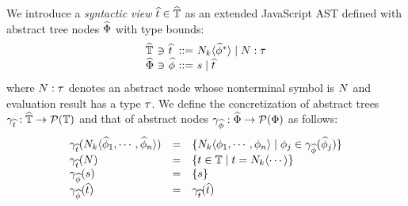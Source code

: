 We introduce a \textit{syntactic view} $\widehat{t} \in \widehat{\mathbb{T}}$ as an extended
JavaScript AST defined with abstract tree nodes $\widehat{\Phi}$ with type bounds:
\[
  \begin{array}{l@{~}c@{~}l@{~}c@{~}l}
    \atreeset &\ni& \atree &::=& \nt_k \langle \anode^* \rangle \mid \nt: \ty \\
    \anodeset &\ni& \anode &::=& \str \mid \atree\\
  \end{array}
\]
where $N: \tau$ denotes an abstract node whose nonterminal symbol is $N$ and
evaluation result has a type $\tau$.  We define the concretization of abstract
trees $\gamma_{\widehat{t}}: \widehat{\mathbb{T}} \rightarrow \mathcal{P}(\mathbb{T})$ and that of
abstract nodes $\gamma_{\widehat{\phi}}: \widehat{\Phi} \rightarrow \mathcal{P}(\Phi)$ as
follows:
\[
  \begin{array}{lcl}
    \gamma_{\widehat{t}}(N_k \langle \widehat{\phi}_1, \cdots, \widehat{\phi}_n \rangle) &=&
    \{ N_k \langle \phi_1, \cdots, \phi_n \rangle \mid \phi_j \in
    \gamma_{\widehat{\phi}}(\widehat{\phi}_j) \}\\

    \gamma_{\widehat{t}}(N) &=&
    \{ t \in \mathbb{T} \mid t = N_k \langle \cdots \rangle \}\\

    \gamma_{\widehat{\phi}}(s) &=& \{ s \}\\

    \gamma_{\widehat{\phi}}(\widehat{t}) &=& \gamma_{\widehat{t}}(\widehat{t})\\
  \end{array}
\]
